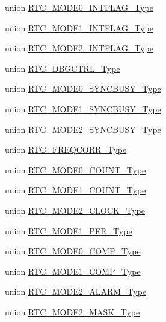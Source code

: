 \begin{DoxyCompactItemize}
\item 
union \hyperlink{union_r_t_c___m_o_d_e0___i_n_t_f_l_a_g___type}{R\+T\+C\+\_\+\+M\+O\+D\+E0\+\_\+\+I\+N\+T\+F\+L\+A\+G\+\_\+\+Type}
\item 
union \hyperlink{union_r_t_c___m_o_d_e1___i_n_t_f_l_a_g___type}{R\+T\+C\+\_\+\+M\+O\+D\+E1\+\_\+\+I\+N\+T\+F\+L\+A\+G\+\_\+\+Type}
\item 
union \hyperlink{union_r_t_c___m_o_d_e2___i_n_t_f_l_a_g___type}{R\+T\+C\+\_\+\+M\+O\+D\+E2\+\_\+\+I\+N\+T\+F\+L\+A\+G\+\_\+\+Type}
\item 
union \hyperlink{union_r_t_c___d_b_g_c_t_r_l___type}{R\+T\+C\+\_\+\+D\+B\+G\+C\+T\+R\+L\+\_\+\+Type}
\item 
union \hyperlink{union_r_t_c___m_o_d_e0___s_y_n_c_b_u_s_y___type}{R\+T\+C\+\_\+\+M\+O\+D\+E0\+\_\+\+S\+Y\+N\+C\+B\+U\+S\+Y\+\_\+\+Type}
\item 
union \hyperlink{union_r_t_c___m_o_d_e1___s_y_n_c_b_u_s_y___type}{R\+T\+C\+\_\+\+M\+O\+D\+E1\+\_\+\+S\+Y\+N\+C\+B\+U\+S\+Y\+\_\+\+Type}
\item 
union \hyperlink{union_r_t_c___m_o_d_e2___s_y_n_c_b_u_s_y___type}{R\+T\+C\+\_\+\+M\+O\+D\+E2\+\_\+\+S\+Y\+N\+C\+B\+U\+S\+Y\+\_\+\+Type}
\item 
union \hyperlink{union_r_t_c___f_r_e_q_c_o_r_r___type}{R\+T\+C\+\_\+\+F\+R\+E\+Q\+C\+O\+R\+R\+\_\+\+Type}
\item 
union \hyperlink{union_r_t_c___m_o_d_e0___c_o_u_n_t___type}{R\+T\+C\+\_\+\+M\+O\+D\+E0\+\_\+\+C\+O\+U\+N\+T\+\_\+\+Type}
\item 
union \hyperlink{union_r_t_c___m_o_d_e1___c_o_u_n_t___type}{R\+T\+C\+\_\+\+M\+O\+D\+E1\+\_\+\+C\+O\+U\+N\+T\+\_\+\+Type}
\item 
union \hyperlink{union_r_t_c___m_o_d_e2___c_l_o_c_k___type}{R\+T\+C\+\_\+\+M\+O\+D\+E2\+\_\+\+C\+L\+O\+C\+K\+\_\+\+Type}
\item 
union \hyperlink{union_r_t_c___m_o_d_e1___p_e_r___type}{R\+T\+C\+\_\+\+M\+O\+D\+E1\+\_\+\+P\+E\+R\+\_\+\+Type}
\item 
union \hyperlink{union_r_t_c___m_o_d_e0___c_o_m_p___type}{R\+T\+C\+\_\+\+M\+O\+D\+E0\+\_\+\+C\+O\+M\+P\+\_\+\+Type}
\item 
union \hyperlink{union_r_t_c___m_o_d_e1___c_o_m_p___type}{R\+T\+C\+\_\+\+M\+O\+D\+E1\+\_\+\+C\+O\+M\+P\+\_\+\+Type}
\item 
union \hyperlink{union_r_t_c___m_o_d_e2___a_l_a_r_m___type}{R\+T\+C\+\_\+\+M\+O\+D\+E2\+\_\+\+A\+L\+A\+R\+M\+\_\+\+Type}
\item 
union \hyperlink{union_r_t_c___m_o_d_e2___m_a_s_k___type}{R\+T\+C\+\_\+\+M\+O\+D\+E2\+\_\+\+M\+A\+S\+K\+\_\+\+Type}

\end{DoxyCompactItemize}
